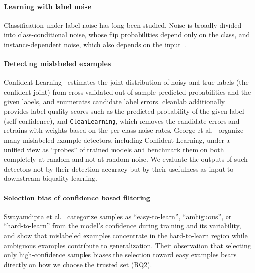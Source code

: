 \documentclass[a4paper,10pt]{article}
\newcommand{\cl}{\textsf{cleanlab}}
\begin{document}
\paragraph{Learning with label noise}
Classification under label noise has long been studied. Noise is broadly divided into class-conditional noise, whose flip probabilities depend only on the class, and instance-dependent noise, which also depends on the input~\cite{frenay2014survey,song2023survey}.

\paragraph{Detecting mislabeled examples}
Confident Learning~\cite{northcutt2021confident} estimates the joint distribution of noisy and true labels (the confident joint) from cross-validated out-of-sample predicted probabilities and the given labels, and enumerates candidate label errors.
\cl{} additionally provides label quality scores such as the predicted probability of the given label (self-confidence), and \texttt{CleanLearning}, which removes the candidate errors and retrains with weights based on the per-class noise rates.
George et al.~\cite{george2024probing} organize many mislabeled-example detectors, including Confident Learning, under a unified view as ``probes'' of trained models and benchmark them on both completely-at-random and not-at-random noise.
We evaluate the outputs of such detectors not by their detection accuracy but by their usefulness as input to downstream biquality learning.

\paragraph{Selection bias of confidence-based filtering}
Swayamdipta et al.~\cite{swayamdipta2020cartography} categorize samples as ``easy-to-learn'', ``ambiguous'', or ``hard-to-learn'' from the model's confidence during training and its variability, and show that mislabeled examples concentrate in the hard-to-learn region while ambiguous examples contribute to generalization.
Their observation that selecting only high-confidence samples biases the selection toward easy examples bears directly on how we choose the trusted set (RQ2).
\end{document}
